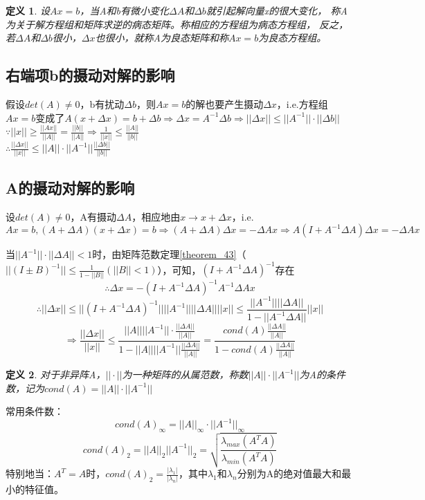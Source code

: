 \documentclass[a4paper]{article}
\newtheorem{definition}{定义}[section]
\begin{document}
\begin{definition}
  设$Ax=b$，当A和b有微小变化$\Delta A$和$\Delta b$就引起解向量x的很大变化，
  称A为关于解方程组和矩阵求逆的病态矩阵。称相应的方程组为病态方程组，
  反之，若$\Delta A$和$\Delta b$很小，$\Delta x$也很小，就称A为良态矩阵和称$Ax=b$为良态方程组。
\end{definition}

\subsection{右端项b的摄动对解的影响}
假设$det(A)\neq 0$，b有扰动$\Delta b$，则$Ax=b$的解也要产生摄动$\Delta x$，i.e.方程组$Ax=b$变成了$A(x+\Delta x)=b+\Delta b\Rightarrow 
\Delta x =A^{-1}\Delta b \Rightarrow ||\Delta x||\le ||A^{-1}||\cdot||\Delta b|| $ \\
$\because ||x||\ge \frac{||Ax||}{||A||}=\frac{||b||}{||A||}\Rightarrow \frac{1}{||x||}\le \frac{||A||}{||b||}$ \\
$\therefore \frac{||\Delta x||}{||x||} \le ||A||\cdot||A^{-1}||\frac{||\Delta b||}{||b||}$

\subsection{A的摄动对解的影响}
设$det(A)\neq 0$，A有摄动$\Delta A$，相应地由$x\rightarrow x+\Delta x$，i.e. 
$Ax=b, (A+\Delta A)(x+\Delta x)=b\Rightarrow (A+\Delta A)\Delta x = -\Delta Ax\Rightarrow A(I+A^{-1}\Delta A)\Delta x = -\Delta Ax$

当$||A^{-1}||\cdot||\Delta A||<1$时，由矩阵范数定理\ref{theorem_43}（$||(I\pm B)^{-1}||\le \frac{1}{1-||B||} (||B||<1)$），可知，$(I+A^{-1}\Delta A)^{-1}$存在
$$\therefore \Delta x = -(I+A^{-1}\Delta A)^{-1}A^{-1}\Delta Ax $$
$$\therefore ||\Delta x||\le ||(I+A^{-1}\Delta A)^{-1}||||A^{-1}||||\Delta A||||x||\le \frac{||A^{-1}||||\Delta A||}{1-||A^{-1}\Delta A||}||x|| $$
$$\Rightarrow \frac{||\Delta x||}{||x||} \le \frac{||A||||A^{-1}||\cdot\frac{||\Delta A||}{||A||}}{1-||A||||A^{-1}||\frac{||\Delta A||}{||A||}} = \frac{cond(A)\frac{||\Delta A||}{||A||}}{1-cond(A)\frac{||\Delta A||}{||A||}}$$

\begin{definition}
  对于非异阵A，$||\cdot||$为一种矩阵的从属范数，称数$||A||\cdot||A^{-1}||$为A的条件数，记为$cond(A)=||A||\cdot||A^{-1}||$
\end{definition}

常用条件数：
$$cond(A)_\infty =||A||_\infty\cdot||A^{-1}||_\infty $$
$$cond(A)_2 = ||A||_2||A^{-1}||_2=\sqrt{\frac{\lambda_{max}(A^TA)}{\lambda_{min}(A^TA)}}$$
特别地当：$A^T=A$时，$cond(A)_2=\frac{|\lambda_1|}{|\lambda_n|}$，其中$\lambda_1$和$\lambda_n$分别为A的绝对值最大和最小的特征值。
\end{document}
